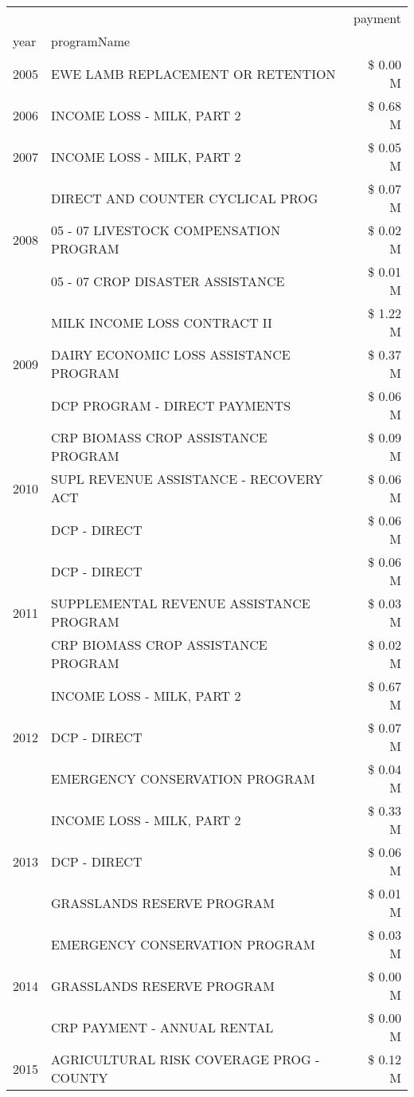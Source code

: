 \begin{tabular}{llr}
\toprule
 &  & payment \\
year & programName &  \\
\midrule
2005 & EWE LAMB REPLACEMENT OR RETENTION & \$ 0.00 M \\
\cline{1-3}
2006 & INCOME LOSS - MILK, PART 2 & \$ 0.68 M \\
\cline{1-3}
2007 & INCOME LOSS - MILK, PART 2 & \$ 0.05 M \\
\cline{1-3}
\multirow[t]{3}{*}{2008} & DIRECT AND COUNTER CYCLICAL PROG & \$ 0.07 M \\
 & 05 - 07 LIVESTOCK COMPENSATION PROGRAM & \$ 0.02 M \\
 & 05 - 07 CROP DISASTER ASSISTANCE & \$ 0.01 M \\
\cline{1-3}
\multirow[t]{3}{*}{2009} & MILK INCOME LOSS CONTRACT II & \$ 1.22 M \\
 & DAIRY ECONOMIC LOSS ASSISTANCE PROGRAM & \$ 0.37 M \\
 & DCP PROGRAM - DIRECT PAYMENTS & \$ 0.06 M \\
\cline{1-3}
\multirow[t]{3}{*}{2010} & CRP BIOMASS CROP ASSISTANCE PROGRAM & \$ 0.09 M \\
 & SUPL REVENUE ASSISTANCE - RECOVERY ACT & \$ 0.06 M \\
 & DCP - DIRECT & \$ 0.06 M \\
\cline{1-3}
\multirow[t]{3}{*}{2011} & DCP - DIRECT & \$ 0.06 M \\
 & SUPPLEMENTAL REVENUE ASSISTANCE PROGRAM & \$ 0.03 M \\
 & CRP BIOMASS CROP ASSISTANCE PROGRAM & \$ 0.02 M \\
\cline{1-3}
\multirow[t]{3}{*}{2012} & INCOME LOSS - MILK, PART 2 & \$ 0.67 M \\
 & DCP - DIRECT & \$ 0.07 M \\
 & EMERGENCY CONSERVATION PROGRAM & \$ 0.04 M \\
\cline{1-3}
\multirow[t]{3}{*}{2013} & INCOME LOSS - MILK, PART 2 & \$ 0.33 M \\
 & DCP - DIRECT & \$ 0.06 M \\
 & GRASSLANDS RESERVE PROGRAM & \$ 0.01 M \\
\cline{1-3}
\multirow[t]{3}{*}{2014} & EMERGENCY CONSERVATION PROGRAM & \$ 0.03 M \\
 & GRASSLANDS RESERVE PROGRAM & \$ 0.00 M \\
 & CRP PAYMENT - ANNUAL RENTAL & \$ 0.00 M \\
\cline{1-3}
\multirow[t]{3}{*}{2015} & AGRICULTURAL RISK COVERAGE PROG - COUNTY & \$ 0.12 M \\

\end{tabular}
